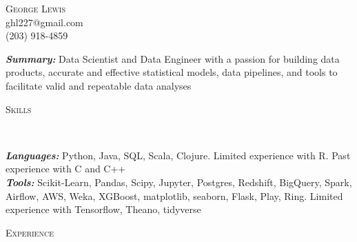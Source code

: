 \documentclass[9pt]{article}
\newenvironment{changemargin}[2]{%
  \begin{list}{}{%
    \setlength{\topsep}{0pt}%
    \setlength{\leftmargin}{#1}%
    \setlength{\rightmargin}{#2}%
    \setlength{\listparindent}{\parindent}%
    \setlength{\itemindent}{\parindent}%
    \setlength{\parsep}{\parskip}%
  }%
  \item[]}{\end{list}
}
\newcommand{\lineover}{
  \begin{changemargin}{-0.05in}{-0.05in}
    \vspace*{-8pt}
    \hrulefill \\
    \vspace*{-2pt}
  \end{changemargin}
}
\newcommand{\header}[1]{
  \begin{changemargin}{-0.5in}{-0.5in}
    \scshape{#1}\\
    \lineover
  \end{changemargin}
}
\newcommand{\contact}[4]{
  \begin{changemargin}{-0.5in}{-0.5in}
    \begin{center}
      {\Large \scshape {#1}}\\ \smallskip
      {#2}\\ \smallskip
      {#3}\\ \smallskip
      {#4}\smallskip
    \end{center}
  \end{changemargin}
}
\newenvironment{body} {
  \vspace*{-16pt}
\begin{changemargin}{-0.25in}{-0.5in}
  }
{\end{changemargin}
}
\begin{document}
\contact{George Lewis}
        {ghl227@gmail.com}
        {(203) 918-4859}
\smallskip

\begin{body}
  \vspace{14pt}
  \emph{\textbf{Summary:}}{} Data Scientist and Data Engineer with a passion for building data products, accurate and effective statistical models, data pipelines, and tools to facilitate valid and repeatable data analyses
\end{body}

\smallskip

\header{Skills}
\begin{body}
  \vspace{14pt}
  \emph{\textbf{Languages:}}{} Python, Java, SQL, Scala, Clojure.  Limited experience with R.  Past experience with C and C++ \\
  \smallskip
  \emph{\textbf{Tools:}}{} Scikit-Learn, Pandas, Scipy, Jupyter, Postgres, Redshift, BigQuery, Spark, Airflow, AWS, Weka, XGBoost, matplotlib, seaborn, Flask, Play, Ring.  Limited experience with Tensorflow, Theano, tidyverse  \\
\end{body}

\smallskip

\header{Experience}
\end{document}
